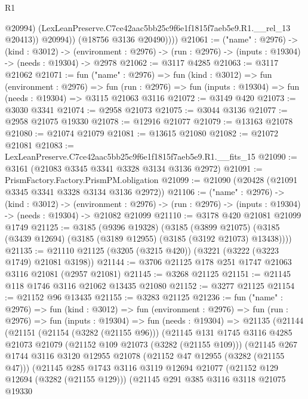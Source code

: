 \begin{lexlean}{R1}
\begin{coremodule}
                  @20994)
                (LexLeanPreserve.C7ce42aac5bb25c9f6e1f1815f7aeb5e9.R1.__rel_13 @20413))
              @20994))
          (@18756 @3136 @20490))))
@21061 := ("name" : @2976) ->
  (kind : @3012) ->
  (environment : @2976) -> (run : @2976) -> (inputs : @19304) -> (needs : @19304) -> @2978
@21062 := @3117 @4285
@21063 := @3117 @21062
@21071 := fun ("name" : @2976) =>
  fun (kind : @3012) =>
  fun (environment : @2976) =>
  fun (run : @2976) => fun (inputs : @19304) => fun (needs : @19304) => @3115 @21063 @3116
@21072 := @3149 @420
@21073 := @3030 @3341
@21074 := @2958 @21073
@21075 := @3044 @3136
@21077 := @2958 @21075 @19330
@21078 := @12916 @21077
@21079 := @13163 @21078
@21080 := @21074 @21079
@21081 := @13615 @21080
@21082 := @21072 @21081
@21083 := LexLeanPreserve.C7ce42aac5bb25c9f6e1f1815f7aeb5e9.R1.__fits_15
@21090 := @3161 (@21083 @3345 @3341 @3328 @3134 @3136 @2972)
@21091 := PrismFactory.Factory.PrismPM.obligation
@21099 := @21090 (@20428 (@21091 @3345 @3341 @3328 @3134 @3136 @2972))
@21106 := ("name" : @2976) ->
  (kind : @3012) ->
  (environment : @2976) -> (run : @2976) -> (inputs : @19304) -> (needs : @19304) -> @21082 @21099
@21110 := @3178 @420 @21081 @21099 @1749
@21125 := @3185
    (@9396 @19328)
    (@3185
      (@3899 @21075)
      (@3185 (@3439 @12694) (@3185 (@3189 @12955) (@3185 (@3192 @21073) @13438))))
@21135 := @21110 @21125 (@3205 (@3215 @420)) (@3221 (@3222 (@3223 @1749) @21081 @3198))
@21144 := @3706 @21125 @178 @251 @1747 @21063 @3116 @21081 (@2957 @21081)
@21145 := @3268 @21125
@21151 := @21145 @118 @1746 @3116 @21062 @13435 @21080
@21152 := @3277 @21125
@21154 := @21152 @96 @13435
@21155 := @3283 @21125
@21236 := fun ("name" : @2976) =>
  fun (kind : @3012) =>
  fun (environment : @2976) =>
  fun (run : @2976) =>
  fun (inputs : @19304) =>
  fun (needs : @19304) =>
  @21135
    (@21144
      (@21151
        (@21154 (@3282 (@21155 @96)))
        (@21145
          @131
          @1745
          @3116
          @4285
          @21073
          @21079
          (@21152 @109 @21073 (@3282 (@21155 @109)))
          (@21145
            @267
            @1744
            @3116
            @3120
            @12955
            @21078
            (@21152 @47 @12955 (@3282 (@21155 @47)))
            (@21145
              @285
              @1743
              @3116
              @3119
              @12694
              @21077
              (@21152 @129 @12694 (@3282 (@21155 @129)))
              (@21145
                @291
                @385
                @3116
                @3118
                @21075
                @19330

\end{coremodule}
\end{lexlean}
